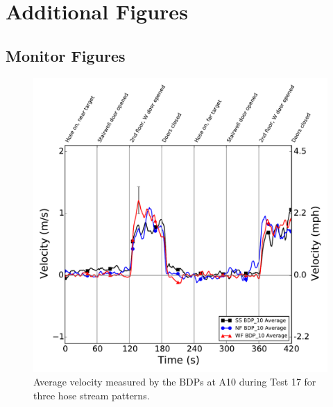 \documentclass[12pt,oneside]{book}
\begin{document}
\section{Additional Figures}
\label{sec:additional_figs}

\subsection{Monitor Figures}
\label{sec:monitor_figs}

\begin{figure}[!ht]
	\includegraphics[width=\columnwidth]{../Figures/Plots/Test_17_West_063014_BDP_A10_stream_avgs}
	\caption{Average velocity measured by the BDPs at A10 during Test 17 for three hose stream patterns.}
	\label{fig:Test_17_BDP_A10_Avg_All}
	\end{figure}
\FloatBarrier
\end{document}
